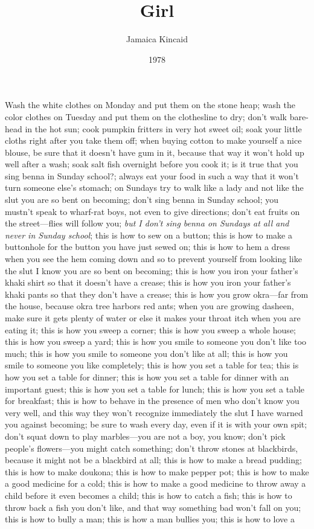 \documentclass[10pt,a4paper]{article}
\begin{document}
\title{Girl}
\date{1978}
\author{Jamaica Kincaid}
\maketitle
    
\thispagestyle{plain}
\setcounter{page}{1}
\linenumbers
\noindent Wash the white clothes on Monday and put them on the stone heap; wash the color clothes on Tuesday and put them on the clothesline to dry; don’t walk bare-head in the hot sun; cook pumpkin fritters in very hot sweet oil; soak your little cloths right after you take them off; when buying cotton to make yourself a nice blouse, be sure that it doesn’t have gum in it, because that way it won’t hold up well after a wash; soak salt fish overnight before you cook it; is it true that you sing benna in Sunday school?; always eat your food in such a way that it won’t turn someone else’s stomach; on Sundays try to walk like a lady and not like the slut you are so bent on becoming; don’t sing benna in Sunday school; you mustn’t speak to wharf-rat boys, not even to give directions; don’t eat fruits on the street—flies will follow you; \emph{but I don’t sing benna on Sundays at all and never in Sunday school}; this is how to sew on a button; this is how to make a buttonhole for the button you have just sewed on; this is how to hem a dress when you see the hem coming down and so to prevent yourself from looking like the slut I know you are so bent on becoming; this is how you iron your father’s khaki shirt so that it doesn’t have a crease; this is how you iron your father’s khaki pants so that they don’t have a crease; this is how you grow okra—far from the house, because okra tree harbors red ants; when you are growing dasheen, make sure it gets plenty of water or else it makes your throat itch when you are eating it; this is how you sweep a corner; this is how you sweep a whole house; this is how you sweep a yard; this is how you smile to someone you don’t like too much; this is how you smile to someone you don’t like at all; this is how you smile to someone you like completely; this is how you set a table for tea; this is how you set a table for dinner; this is how you set a table for dinner with an important guest; this is how you set a table for lunch; this is how you set a table for breakfast; this is how to behave in the presence of men who don’t know you very well, and this way they won’t recognize immediately the slut I have warned you against becoming; be sure to wash every day, even if it is with your own spit; don’t squat down to play marbles—you are not a boy, you know; don’t pick people’s flowers—you might catch something; don’t throw stones at blackbirds, because it might not be a blackbird at all; this is how to make a bread pudding; this is how to make doukona; this is how to make pepper pot; this is how to make a good medicine for a cold; this is how to make a good medicine to throw away a child before it even becomes a child; this is how to catch a fish; this is how to throw back a fish you don’t like, and that way something bad won’t fall on you; this is how to bully a man; this is how a man bullies you; this is how to love a 
\end{document}

